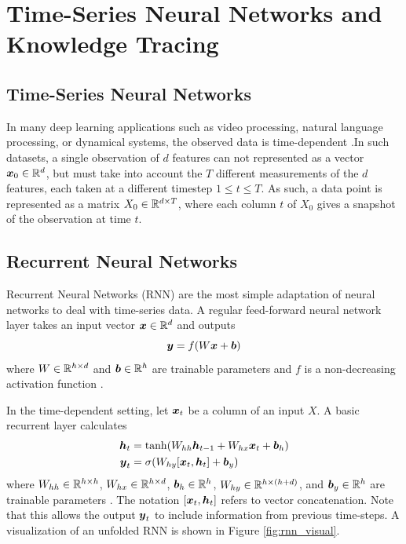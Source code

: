 \chapter{Time-Series Neural Networks and Knowledge Tracing}

\section*{Time-Series Neural Networks}
In many deep learning applications such as video processing, natural language processing, or dynamical systems, the observed data is time-dependent \cite{kahou2015} \cite{vaswani2017} \cite{gilpin2020}.In such datasets, a single observation of $d$ features can not represented as a vector $\boldsymbol{x}_0 \in \mathbb{R}^d$, but must take into account the $T$ different measurements of the $d$ features, each taken at a different timestep $1 \leq t \leq T$. As such, a data point is represented as a matrix $X_0 \in \mathbb{R}^{d \times T}$, where each column $t$ of $X_0$ gives a snapshot of the observation at time $t$. 

\section{Recurrent Neural Networks}
Recurrent Neural Networks (RNN) are the most simple adaptation of neural networks to deal with time-series data. A regular feed-forward neural network layer takes an input vector $\boldsymbol{x} \in \mathbb{R}^d$ and outputs
\begin{equation}
  \boldsymbol{y} = f( W\boldsymbol{x} + \boldsymbol{b})
  \label{eq:ffn_layer}
\end{equation}
where $W \in \mathbb{R}^{h \times d}$ and $\boldsymbol{b} \in \mathbb{R}^h$ are trainable parameters and $f$ is a non-decreasing activation function \cite{sharma2020}. 

In the time-dependent setting, let $\boldsymbol{x}_t$ be a column of an input $X$. A basic recurrent layer calculates 
\begin{equation}
  \begin{split}
    \boldsymbol{h}_t &= \tanh(W_{hh}\boldsymbol{h}_{t-1} + W_{hx}\boldsymbol{x}_t + \boldsymbol{b}_h) \\
    \boldsymbol{y}_t &= \sigma(W_{hy}[\boldsymbol{x}_t, \boldsymbol{h}_t] + \boldsymbol{b}_y)
\end{split}
  \label{eq:rnn_layer}
\end{equation}
where $W_{hh} \in \mathbb{R}^{h\times h}$, $W_{hx}\in \mathbb{R}^{h\times d}$, $\boldsymbol{b}_h \in \mathbb{R}^h$, $W_{hy} \in \mathbb{R}^{h \times (h+d)}$, and $\boldsymbol{b}_y \in \mathbb{R}^h$ are trainable parameters \cite{elman1990}. The notation $[\boldsymbol{x}_t, \boldsymbol{h}_t]$ refers to vector concatenation. Note that this allows the output $\boldsymbol{y}_t$ to include information from previous time-steps. A visualization of an unfolded RNN is shown in Figure \ref{fig:rnn_visual}.

